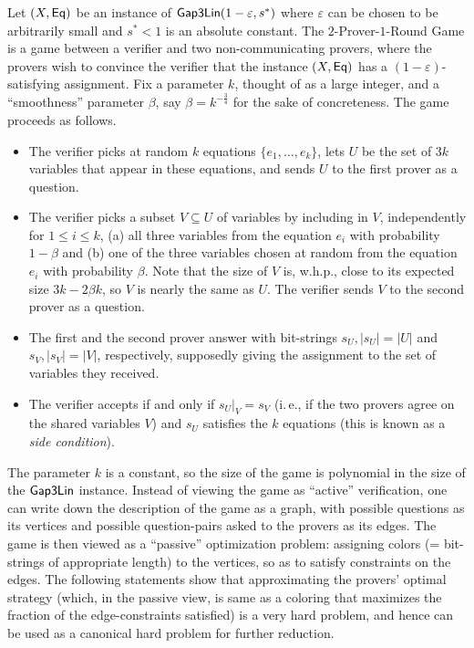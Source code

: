 \documentclass[11pt]{article}
\numberwithin{equation}{section}
\theoremstyle{definition}
\theoremstyle{plain}
\newcommand{\ie}{i.\,e.}
\newcommand\eps{\varepsilon}
\renewcommand\leq{\leqslant}
\begin{document}
Let $(X, {\sf Eq})$ be an instance of ${\sf Gap3Lin}(1-\eps, s^*)$ where $\eps$ can be chosen to be arbitrarily small and $s^* < 1$ is an
absolute constant.
The $2$-Prover-$1$-Round Game is a game between a verifier and two non-communicating provers, where
the provers wish to convince the verifier that the instance $(X, {\sf Eq})$ has a $(1-\eps)$-satisfying assignment. Fix a parameter $k$, thought of as a
large integer, and a ``smoothness'' parameter $\beta$, say $\beta = k^{-\frac{3}{4}}$ for the sake of concreteness. The game proceeds as follows. %
%
\begin{itemize}
\item The verifier picks at random $k$ equations $\{e_1,\ldots, e_k \}$, lets $U$
%
be the set of $3k$ variables that appear in these equations, and
      sends $U$ to the first prover as a question.
\item The verifier picks a subset
%
$V \subseteq U$ of variables  %
by including in $V$, independently for $1 \leq i \leq k$,
     (a) all three variables from the equation $e_i$  with probability $1-\beta$ and (b)
      one of the three
      variables chosen at random from the equation $e_i$ with probability $\beta$. Note that the size of $V$ is, w.h.p., close to its
      expected size $3k-2\beta k$, so $V$ is nearly the same as $U$. The verifier sends $V$ to the second prover as a question.
\item %
%
The first and the second prover  %
      answer with bit-strings $s_U, |s_U|=|U|$ and  $s_V, |s_V|=|V|$, respectively, supposedly giving the assignment
      to the set of variables they received.
\item The verifier accepts if and only if $s_U|_V = s_V$ (\ie, if the two provers agree on the shared variables $V$) and  $s_U$ satisfies
      the $k$ equations (this is known as a \emph{side condition}). %
%
\end{itemize}
The parameter $k$ is a constant, so the size of the game
is polynomial in the size of the ${\sf Gap3Lin}$ instance.
Instead of viewing the game as  ``active'' verification, one can write down the description
of the game as a graph, with possible questions as its vertices and possible question-pairs
asked to the provers as its edges.
The game is then viewed as a ``passive'' optimization problem:
assigning colors (= bit-strings of appropriate length) to the vertices, so as to satisfy constraints on the edges.
The following statements show that approximating the provers' optimal strategy (which, in the passive view, is same as a coloring that maximizes
the fraction of the edge-constraints satisfied)
is a very hard problem, and hence can be
used as a canonical hard problem for further reduction.
\end{document}
